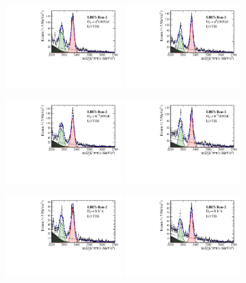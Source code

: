 \begin{figure}[h]
\centering
\includegraphics[height=!,width=0.4\textwidth]{figs/MassFit/signal_Run2_phipi_t0.pdf}
\includegraphics[height=!,width=0.4\textwidth]{figs/MassFit/signal_Run2_phipi_t1.pdf}

\includegraphics[height=!,width=0.4\textwidth]{figs/MassFit/signal_Run2_KsK_t0.pdf}
\includegraphics[height=!,width=0.4\textwidth]{figs/MassFit/signal_Run2_KsK_t1.pdf}

\includegraphics[height=!,width=0.4\textwidth]{figs/MassFit/signal_Run2_KKpi_NR_t0.pdf}
\includegraphics[height=!,width=0.4\textwidth]{figs/MassFit/signal_Run2_KKpi_NR_t1.pdf}


\end{figure}
